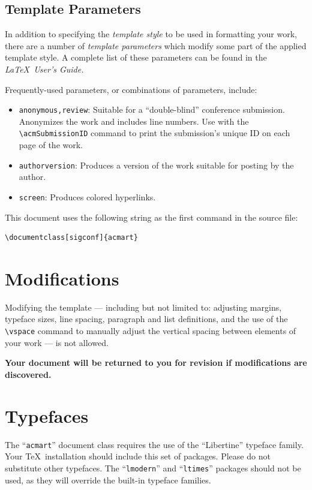\documentclass[sigconf]{acmart}
\begin{document}
\subsection{Template Parameters}

In addition to specifying the {\itshape template style} to be used in
formatting your work, there are a number of {\itshape template parameters}
which modify some part of the applied template style. A complete list
of these parameters can be found in the {\itshape \LaTeX\ User's Guide.}

Frequently-used parameters, or combinations of parameters, include:
\begin{itemize}
\item {\verb|anonymous,review|}: Suitable for a ``double-blind''
  conference submission. Anonymizes the work and includes line
  numbers. Use with the \verb|\acmSubmissionID| command to print the
  submission's unique ID on each page of the work.
\item{\verb|authorversion|}: Produces a version of the work suitable
  for posting by the author.
\item{\verb|screen|}: Produces colored hyperlinks.
\end{itemize}

This document uses the following string as the first command in the
source file:
\begin{verbatim}
\documentclass[sigconf]{acmart}
\end{verbatim}

\section{Modifications}

Modifying the template --- including but not limited to: adjusting
margins, typeface sizes, line spacing, paragraph and list definitions,
and the use of the \verb|\vspace| command to manually adjust the
vertical spacing between elements of your work --- is not allowed.

{\bfseries Your document will be returned to you for revision if
  modifications are discovered.}

\section{Typefaces}

The ``\verb|acmart|'' document class requires the use of the
``Libertine'' typeface family. Your \TeX\ installation should include
this set of packages. Please do not substitute other typefaces. The
``\verb|lmodern|'' and ``\verb|ltimes|'' packages should not be used,
as they will override the built-in typeface families.
\end{document}

